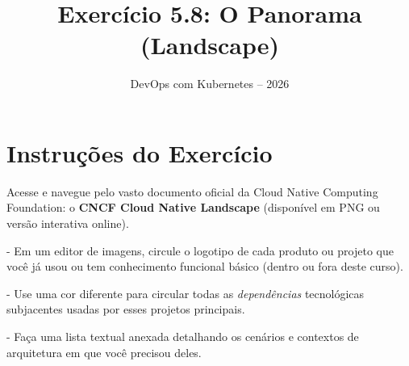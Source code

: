 \documentclass[11pt,a4paper]{article}
\title{\color{secondary}\Huge\textbf{Exercício 5.8: O Panorama (Landscape)}}
\author{\color{primary}DevOps com Kubernetes -- 2026}
\date{}
\begin{document}
\maketitle

\section*{\color{primary}Instruções do Exercício}
\begin{tcolorbox}[colback=blue!5!white,colframe=blue!75!black,title=Exercício 5.8: O Panorama (Landscape)]
Acesse e navegue pelo vasto documento oficial da Cloud Native Computing Foundation: o \textbf{CNCF Cloud Native Landscape} (disponível em PNG ou versão interativa online).

- Em um editor de imagens, circule o logotipo de cada produto ou projeto que você já usou ou tem conhecimento funcional básico (dentro ou fora deste curso).

- Use uma cor diferente para circular todas as \textit{dependências} tecnológicas subjacentes usadas por esses projetos principais.

- Faça uma lista textual anexada detalhando os cenários e contextos de arquitetura em que você precisou deles.
\end{tcolorbox}
\end{document}
